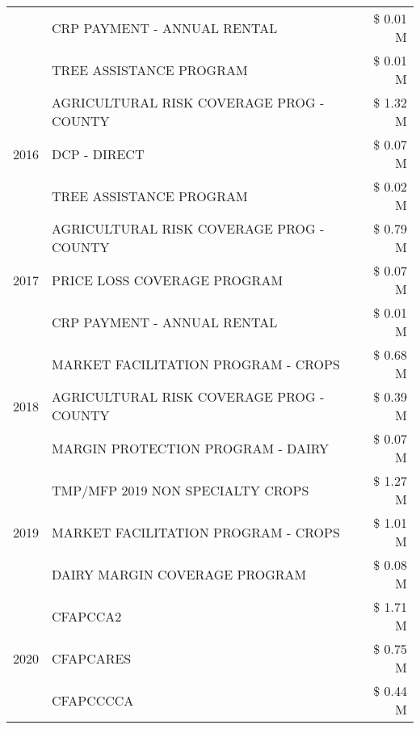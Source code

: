 \begin{tabular}{llr}
 & CRP PAYMENT - ANNUAL RENTAL & \$ 0.01 M \\
 & TREE ASSISTANCE PROGRAM & \$ 0.01 M \\
\cline{1-3}
\multirow[t]{3}{*}{2016} & AGRICULTURAL RISK COVERAGE PROG - COUNTY & \$ 1.32 M \\
 & DCP - DIRECT & \$ 0.07 M \\
 & TREE ASSISTANCE PROGRAM & \$ 0.02 M \\
\cline{1-3}
\multirow[t]{3}{*}{2017} & AGRICULTURAL RISK COVERAGE PROG - COUNTY & \$ 0.79 M \\
 & PRICE LOSS COVERAGE PROGRAM & \$ 0.07 M \\
 & CRP PAYMENT - ANNUAL RENTAL & \$ 0.01 M \\
\cline{1-3}
\multirow[t]{3}{*}{2018} & MARKET FACILITATION PROGRAM - CROPS & \$ 0.68 M \\
 & AGRICULTURAL RISK COVERAGE PROG - COUNTY & \$ 0.39 M \\
 & MARGIN PROTECTION PROGRAM - DAIRY & \$ 0.07 M \\
\cline{1-3}
\multirow[t]{3}{*}{2019} & TMP/MFP 2019 NON SPECIALTY CROPS & \$ 1.27 M \\
 & MARKET FACILITATION PROGRAM - CROPS & \$ 1.01 M \\
 & DAIRY MARGIN COVERAGE PROGRAM & \$ 0.08 M \\
\cline{1-3}
\multirow[t]{3}{*}{2020} & CFAPCCA2 & \$ 1.71 M \\
 & CFAPCARES & \$ 0.75 M \\
 & CFAPCCCCA & \$ 0.44 M \\
\cline{1-3}
\bottomrule
\end{tabular}
